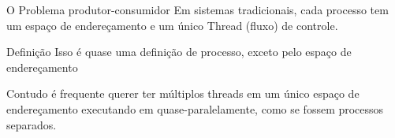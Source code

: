 \documentclass[11pt]{beamer}
\begin{document}
\begin{frame}{O Problema produtor-consumidor}
 Em sistemas tradicionais, cada processo tem um espaço de endereçamento e um único Thread (fluxo) de controle.
 \begin{block}{Definição}
 	Isso é quase uma definição de processo, exceto pelo espaço de endereçamento
 \end{block}
 Contudo é frequente querer ter múltiplos threads em um único espaço de endereçamento executando em quase-paralelamente, como se fossem processos separados.
\end{frame}
\end{document}
